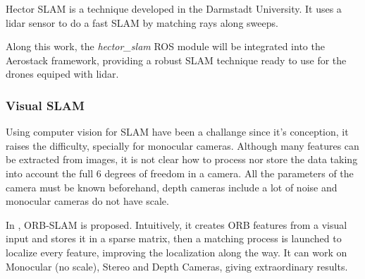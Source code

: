       Hector SLAM \cite{KohlbrecherMeyerStrykKlingaufFlexibleSlamSystem2011} is a technique developed in the Darmstadt University. It uses a lidar sensor to do a fast SLAM by matching rays along sweeps.

      Along this work, the \textit{hector\_slam} ROS module will be integrated into the Aerostack framework, providing a robust SLAM technique ready to use for the drones equiped with lidar.

    \subsubsection{Visual SLAM}

      Using computer vision for SLAM have been a challange since it's conception, it raises the difficulty, specially for monocular cameras. Although many features can be extracted from images, it is not clear how to process nor store the data taking into account the full 6 degrees of freedom in a camera. All the parameters of the camera must be known beforehand, depth cameras include a lot of noise and monocular cameras do not have scale.

      In \cite{murTRO2015}, ORB-SLAM is proposed. Intuitively, it creates ORB features from a visual input and stores it in a sparse matrix, then a matching process is launched to localize every feature, improving the localization along the way. It can work on Monocular (no scale), Stereo and Depth Cameras, giving extraordinary results.

  \begin{comment}
    \begin{itemize}
    \end{itemize}
  \end{comment}
